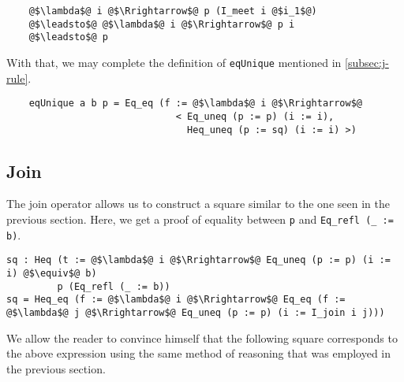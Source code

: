 \documentclass[12pt,twoside,maitrise]{dms}
\theoremstyle{definition}
\numberwithin{equation}{section}
\numberwithin{table}{chapter}
\numberwithin{figure}{chapter}
\newcommand\id[1] {\texttt{#1}}
\newcommand\fn[1] {\texttt{#1}}
\begin{document}
\begin{verbatim}
    @$\lambda$@ i @$\Rrightarrow$@ p (I_meet i @$i_1$@)
    @$\leadsto$@ @$\lambda$@ i @$\Rrightarrow$@ p i
    @$\leadsto$@ p
\end{verbatim}

With that, we may complete the definition of \id{eqUnique} mentioned in
\autoref{subsec:j-rule}.

\begin{verbatim}
    eqUnique a b p = Eq_eq (f := @$\lambda$@ i @$\Rrightarrow$@
                              < Eq_uneq (p := p) (i := i),
                                Heq_uneq (p := sq) (i := i) >)
\end{verbatim}


\subsection*{Join}

The join operator allows us to construct a square similar to the one seen in the
previous section. Here, we get a proof of equality between \id{p} and \fn{Eq_refl
  (_ := b)}.

\begin{verbatim}
sq : Heq (t := @$\lambda$@ i @$\Rrightarrow$@ Eq_uneq (p := p) (i := i) @$\equiv$@ b)
         p (Eq_refl (_ := b))
sq = Heq_eq (f := @$\lambda$@ i @$\Rrightarrow$@ Eq_eq (f := @$\lambda$@ j @$\Rrightarrow$@ Eq_uneq (p := p) (i := I_join i j)))
\end{verbatim}

We allow the reader to convince himself that the following square corresponds to
the above expression using the same method of reasoning that was employed in the
previous section.
\end{document}
